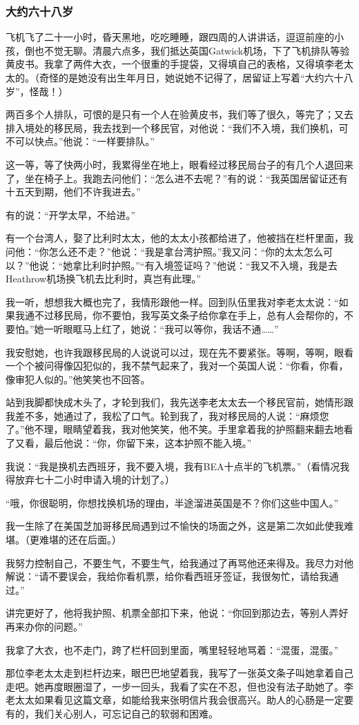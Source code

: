 \subsubsection*{大约六十八岁}
\par 飞机飞了二十一小时，昏天黑地，吃吃睡睡，跟四周的人讲讲话，逗逗前座的小孩，倒也不觉无聊。清晨六点多，我们抵达英国Gatwick机场，下了飞机排队等验黄皮书。我拿了两件大衣，一个很重的手提袋，又得填自己的表格，又得填李老太太的。（奇怪的是她没有出生年月日，她说她不记得了，居留证上写着“大约六十八岁”，怪哉！）
\par 两百多个人排队，可恨的是只有一个人在验黄皮书，我们等了很久，等完了；又去排入境处的移民局，我去找到一个移民官，对他说：“我们不入境，我们换机，可不可以快点。”他说：“一样要排队。”
\par 这一等，等了快两小时，我累得坐在地上，眼看经过移民局台子的有几个人退回来了，坐在椅子上。我跑去问他们：“怎么进不去呢？”有的说：“我英国居留证还有十五天到期，他们不许我进去。”
\par 有的说：“开学太早，不给进。”
\par 有一个台湾人，娶了比利时太太，他的太太小孩都给进了，他被挡在栏杆里面，我问他：“你怎么还不走？”他说：“我是拿台湾护照。”我又问：“你的太太怎么可以？”他说：“她拿比利时护照。”“有入境签证吗？”他说：“我又不入境，我是去Heathrow机场换飞机去比利时，真岂有此理。”
\par 我一听，想想我大概也完了，我情形跟他一样。回到队伍里我对李老太太说：“如果我通不过移民局，你不要怕，我写英文条子给你拿在手上，总有人会帮你的，不要怕。”她一听眼眶马上红了，她说：“我可以等你，我话不通……”
\par 我安慰她，也许我跟移民局的人说说可以过，现在先不要紧张。等啊，等啊，眼看一个个被问得像囚犯似的，我不禁气起来了，我对一个英国人说：“你看，你看，像审犯人似的。”他笑笑也不回答。
\par 站到我脚都快成木头了，才轮到我们，我先送李老太太去一个移民官前，她情形跟我差不多，她通过了，我松了口气。轮到我了，我对移民局的人说：“麻烦您了。”他不理，眼睛望着我，我对他笑笑，他不笑。手里拿着我的护照翻来翻去地看了又看，最后他说：“你，你留下来，这本护照不能入境。”
\par 我说：“我是换机去西班牙，我不要入境，我有BEA十点半的飞机票。”（看情况我得放弃七十二小时申请入境的计划了。）
\par “哦，你很聪明，你想找换机场的理由，半途溜进英国是不？你们这些中国人。”
\par 我一生除了在美国芝加哥移民局遇到过不愉快的场面之外，这是第二次如此使我难堪。（更难堪的还在后面。）
\par 我努力控制自己，不要生气，不要生气，给我通过了再骂他还来得及。我尽力对他解说：“请不要误会，我给你看机票，给你看西班牙签证，我很匆忙，请给我通过。”
\par 讲完更好了，他将我护照、机票全部扣下来，他说：“你回到那边去，等别人弄好再来办你的问题。”
\par 我拿了大衣，也不走门，跨了栏杆回到里面，嘴里轻轻地骂着：“混蛋，混蛋。”
\par 那位李老太太走到栏杆边来，眼巴巴地望着我，我写了一张英文条子叫她拿着自己走吧。她再度眼圈湿了，一步一回头，我看了实在不忍，但也没有法子助她了。李老太太如果看见这篇文章，如能给我来张明信片我会很高兴。助人的心肠是一定要有的，我们关心别人，可忘记自己的软弱和困难。
